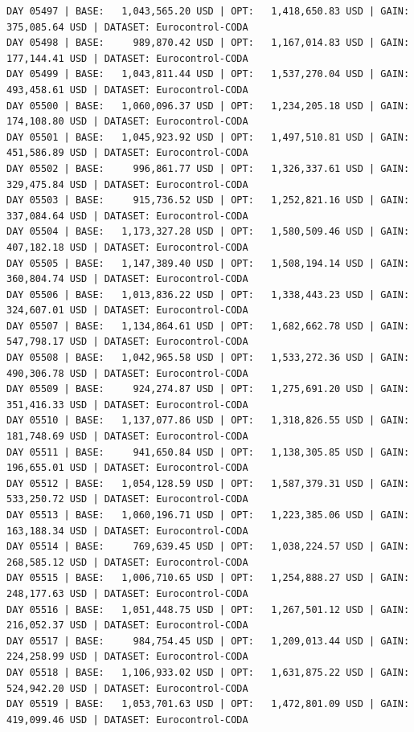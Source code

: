 \documentclass[11pt,a4paper]{article}
\begin{document}
\begin{verbatim}
DAY 05497 | BASE:   1,043,565.20 USD | OPT:   1,418,650.83 USD | GAIN: 375,085.64 USD | DATASET: Eurocontrol-CODA
DAY 05498 | BASE:     989,870.42 USD | OPT:   1,167,014.83 USD | GAIN: 177,144.41 USD | DATASET: Eurocontrol-CODA
DAY 05499 | BASE:   1,043,811.44 USD | OPT:   1,537,270.04 USD | GAIN: 493,458.61 USD | DATASET: Eurocontrol-CODA
DAY 05500 | BASE:   1,060,096.37 USD | OPT:   1,234,205.18 USD | GAIN: 174,108.80 USD | DATASET: Eurocontrol-CODA
DAY 05501 | BASE:   1,045,923.92 USD | OPT:   1,497,510.81 USD | GAIN: 451,586.89 USD | DATASET: Eurocontrol-CODA
DAY 05502 | BASE:     996,861.77 USD | OPT:   1,326,337.61 USD | GAIN: 329,475.84 USD | DATASET: Eurocontrol-CODA
DAY 05503 | BASE:     915,736.52 USD | OPT:   1,252,821.16 USD | GAIN: 337,084.64 USD | DATASET: Eurocontrol-CODA
DAY 05504 | BASE:   1,173,327.28 USD | OPT:   1,580,509.46 USD | GAIN: 407,182.18 USD | DATASET: Eurocontrol-CODA
DAY 05505 | BASE:   1,147,389.40 USD | OPT:   1,508,194.14 USD | GAIN: 360,804.74 USD | DATASET: Eurocontrol-CODA
DAY 05506 | BASE:   1,013,836.22 USD | OPT:   1,338,443.23 USD | GAIN: 324,607.01 USD | DATASET: Eurocontrol-CODA
DAY 05507 | BASE:   1,134,864.61 USD | OPT:   1,682,662.78 USD | GAIN: 547,798.17 USD | DATASET: Eurocontrol-CODA
DAY 05508 | BASE:   1,042,965.58 USD | OPT:   1,533,272.36 USD | GAIN: 490,306.78 USD | DATASET: Eurocontrol-CODA
DAY 05509 | BASE:     924,274.87 USD | OPT:   1,275,691.20 USD | GAIN: 351,416.33 USD | DATASET: Eurocontrol-CODA
DAY 05510 | BASE:   1,137,077.86 USD | OPT:   1,318,826.55 USD | GAIN: 181,748.69 USD | DATASET: Eurocontrol-CODA
DAY 05511 | BASE:     941,650.84 USD | OPT:   1,138,305.85 USD | GAIN: 196,655.01 USD | DATASET: Eurocontrol-CODA
DAY 05512 | BASE:   1,054,128.59 USD | OPT:   1,587,379.31 USD | GAIN: 533,250.72 USD | DATASET: Eurocontrol-CODA
DAY 05513 | BASE:   1,060,196.71 USD | OPT:   1,223,385.06 USD | GAIN: 163,188.34 USD | DATASET: Eurocontrol-CODA
DAY 05514 | BASE:     769,639.45 USD | OPT:   1,038,224.57 USD | GAIN: 268,585.12 USD | DATASET: Eurocontrol-CODA
DAY 05515 | BASE:   1,006,710.65 USD | OPT:   1,254,888.27 USD | GAIN: 248,177.63 USD | DATASET: Eurocontrol-CODA
DAY 05516 | BASE:   1,051,448.75 USD | OPT:   1,267,501.12 USD | GAIN: 216,052.37 USD | DATASET: Eurocontrol-CODA
DAY 05517 | BASE:     984,754.45 USD | OPT:   1,209,013.44 USD | GAIN: 224,258.99 USD | DATASET: Eurocontrol-CODA
DAY 05518 | BASE:   1,106,933.02 USD | OPT:   1,631,875.22 USD | GAIN: 524,942.20 USD | DATASET: Eurocontrol-CODA
DAY 05519 | BASE:   1,053,701.63 USD | OPT:   1,472,801.09 USD | GAIN: 419,099.46 USD | DATASET: Eurocontrol-CODA

\end{verbatim}
\end{document}

